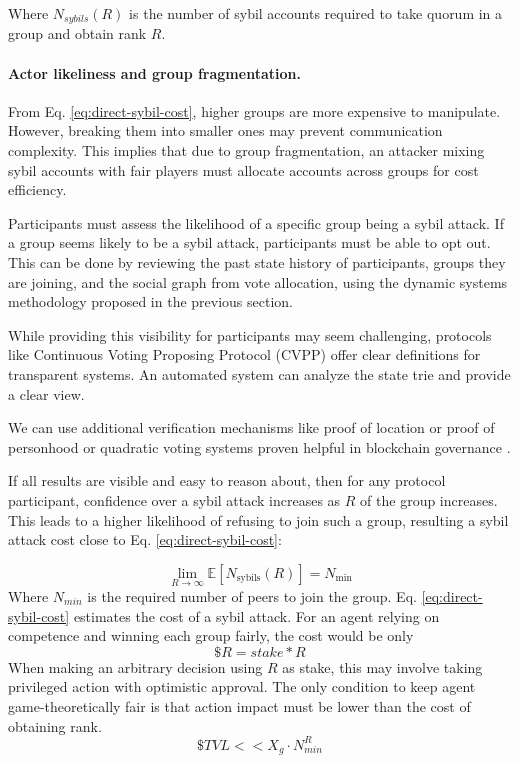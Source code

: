 \documentclass{article}
\begin{document}
\begin{CJK}{UTF8}{gbsn}
    Where $N_{sybils}(R)$ is the number of sybil accounts required to take quorum in a group and obtain rank $R$.
    \paragraph{Actor likeliness and group fragmentation.}
    From Eq. \ref{eq:direct-sybil-cost}, higher groups are more expensive to manipulate. However, breaking them into smaller ones may prevent communication complexity. This implies that due to group fragmentation, an attacker mixing sybil accounts with fair players must allocate accounts across groups for cost efficiency.

    Participants must assess the likelihood of a specific group being a sybil attack. If a group seems likely to be a sybil attack, participants must be able to opt out. This can be done by reviewing the past state history of participants, groups they are joining, and the social graph from vote allocation, using the dynamic systems methodology proposed in the previous section.

    While providing this visibility for participants may seem challenging, protocols like Continuous Voting Proposing Protocol (CVPP) \cite{cvpp} offer clear definitions for transparent systems. An automated system can analyze the state trie and provide a clear view.

    We can use additional verification mechanisms like proof of location \cite{sheng2024bftpolocbyzantinefortifiedtrigonometric} or proof of personhood \cite{WorldCoin2024} or quadratic voting systems proven helpful in blockchain governance \cite{Buterin20}\cite{Benhaim2024}.

    If all results are visible and easy to reason about, then for any protocol participant, confidence over a sybil attack increases as $R$ of the group increases. This leads to a higher likelihood of refusing to join such a group, resulting a sybil attack cost close to Eq. \ref{eq:direct-sybil-cost}:

    \begin{equation}
        \lim_{R \to \infty} \mathbb{E}[N_{\text{sybils}}(R)] = N_{\text{min}}
        \label{eq:limit-nmin}
    \end{equation} Where $N_{min}$ is the required number of peers to join the group. Eq. \ref{eq:direct-sybil-cost} estimates the cost of a sybil attack. For an agent relying on competence and winning each group fairly, the cost would be only
    \begin{equation}
        \$R = stake*R
    \end{equation}
    When making an arbitrary decision using $R$ as stake, this may involve taking privileged action with optimistic approval. The only condition to keep agent game-theoretically fair is that action impact must be lower than the cost of obtaining rank.
    \begin{equation}
        \$TVL <<  X_g \cdot N_{min}^R
    \end{equation}


\end{CJK}
\end{document}
